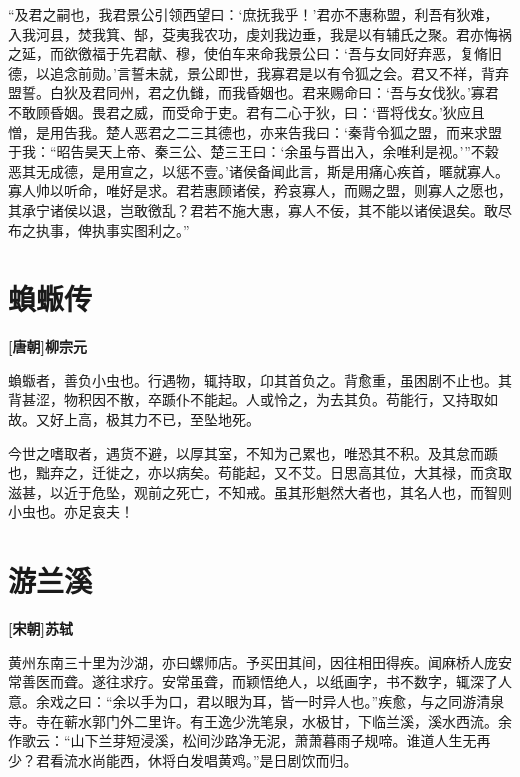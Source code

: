 \documentclass[UTF8,titlepage,oneside]{ctexbook}
\begin{document}
“及君之嗣也，我君景公引领西望曰：‘庶抚我乎！’君亦不惠称盟，利吾有狄难，入我河县，焚我箕、郜，芟夷我农功，虔刘我边垂，我是以有辅氏之聚。君亦悔祸之延，而欲徼福于先君献、穆，使伯车来命我景公曰：‘吾与女同好弃恶，复脩旧德，以追念前勋。’言誓未就，景公即世，我寡君是以有令狐之会。君又不祥，背弃盟誓。白狄及君同州，君之仇雠，而我昏姻也。君来赐命曰：‘吾与女伐狄。’寡君不敢顾昏姻。畏君之威，而受命于吏。君有二心于狄，曰：‘晋将伐女。’狄应且憎，是用告我。楚人恶君之二三其德也，亦来告我曰：‘秦背令狐之盟，而来求盟于我：“昭告昊天上帝、秦三公、楚三王曰：‘余虽与晋出入，余唯利是视。’”不榖恶其无成德，是用宣之，以惩不壹。’诸侯备闻此言，斯是用痛心疾首，暱就寡人。寡人帅以听命，唯好是求。君若惠顾诸侯，矜哀寡人，而赐之盟，则寡人之愿也，其承宁诸侯以退，岂敢徼乱？君若不施大惠，寡人不佞，其不能以诸侯退矣。敢尽布之执事，俾执事实图利之。”



\chapter*{蝜蝂传}
\begin{center}
	\textbf{[唐朝]柳宗元}
\end{center}

蝜蝂者，善负小虫也。行遇物，辄持取，卬其首负之。背愈重，虽困剧不止也。其背甚涩，物积因不散，卒踬仆不能起。人或怜之，为去其负。苟能行，又持取如故。又好上高，极其力不已，至坠地死。

今世之嗜取者，遇货不避，以厚其室，不知为己累也，唯恐其不积。及其怠而踬也，黜弃之，迁徙之，亦以病矣。苟能起，又不艾。日思高其位，大其禄，而贪取滋甚，以近于危坠，观前之死亡，不知戒。虽其形魁然大者也，其名人也，而智则小虫也。亦足哀夫！


\chapter*{游兰溪}
\begin{center}
	\textbf{[宋朝]苏轼}
\end{center}


黄州东南三十里为沙湖，亦曰螺师店。予买田其间，因往相田得疾。闻麻桥人庞安常善医而聋。遂往求疗。安常虽聋，而颖悟绝人，以纸画字，书不数字，辄深了人意。余戏之曰：“余以手为口，君以眼为耳，皆一时异人也。”疾愈，与之同游清泉寺。寺在蕲水郭门外二里许。有王逸少洗笔泉，水极甘，下临兰溪，溪水西流。余作歌云：“山下兰芽短浸溪，松间沙路净无泥，萧萧暮雨子规啼。谁道人生无再少？君看流水尚能西，休将白发唱黄鸡。”是日剧饮而归。
\end{document}
